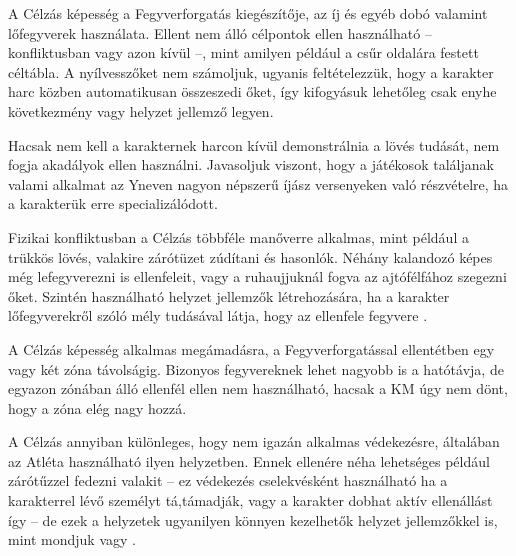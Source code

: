 
A Célzás képesség a Fegyverforgatás kiegészítője, az íj és egyéb dobó valamint lőfegyverek használata. Ellent nem álló célpontok ellen használható -- konfliktusban vagy azon kívül --, mint amilyen például a csűr oldalára festett céltábla. A nyílvesszőket nem számoljuk, ugyanis feltételezzük, hogy a karakter harc közben automatikusan összeszedi őket, így kifogyásuk lehetőleg csak enyhe következmény vagy helyzet jellemző legyen.

\overcome Hacsak nem kell a karakternek harcon kívül demonstrálnia a lövés tudását, nem fogja akadályok ellen használni. Javasoljuk viszont, hogy a játékosok találjanak valami alkalmat az Yneven nagyon népszerű íjász versenyeken való részvételre, ha a karakterük erre specializálódott.

\advantage Fizikai konfliktusban a Célzás többféle manőverre alkalmas, mint például a trükkös lövés, valakire zárótüzet zúdítani és hasonlók. Néhány kalandozó képes még lefegyverezni is ellenfeleit, vagy a ruhaujjuknál fogva az ajtófélfához szegezni őket. Szintén használható helyzet jellemzők létrehozására, ha a karakter lőfegyverekről szóló mély tudásával látja, hogy az ellenfele fegyvere .

\attack A Célzás képesség alkalmas megámadásra, a Fegyverforgatással ellentétben egy vagy két zóna távolságig. Bizonyos fegyvereknek lehet nagyobb is a hatótávja, de egyazon zónában álló ellenfél ellen nem használható, hacsak a KM úgy nem dönt, hogy a zóna elég nagy hozzá.

 A Célzás annyiban különleges, hogy nem igazán alkalmas védekezésre, általában az Atléta használható ilyen helyzetben. Ennek ellenére néha lehetséges például zárótűzzel fedezni valakit -- ez védekezés cselekvésként használható ha a karakterrel lévő személyt tá,támadják, vagy a karakter dobhat aktív ellenállást így -- de ezek a helyzetek ugyanilyen könnyen kezelhetők helyzet jellemzőkkel is, mint mondjuk  vagy .

